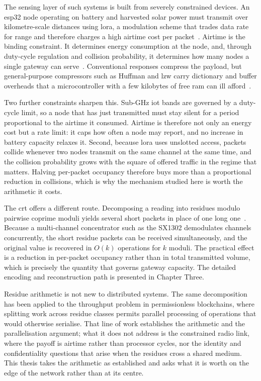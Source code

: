\documentclass[12pt,a4paper,oneside]{book}
\begin{document}
The sensing layer of such systems is built from severely constrained devices.
An \gls{esp32} node operating on battery and harvested solar power must
transmit over kilometre-scale distances using \gls{lora}, a modulation scheme
that trades data rate for range and therefore charges a high airtime cost per
packet~\cite{raza2018lorawan, adelantado2017understanding}. Airtime is the
binding constraint. It determines energy consumption at the node, and, through
duty-cycle regulation and collision probability, it determines how many nodes a
single gateway can serve~\cite{mohammed2025loraEnergy}. Conventional responses
compress the payload, but general-purpose compressors such as Huffman and
\gls{lzw} carry dictionary and buffer overheads that a microcontroller with a
few kilobytes of free \gls{ram} can ill
afford~\cite{marcelloni2009energy, chen2025compression}.

Two further constraints sharpen this. Sub-GHz \gls{iot} bands are governed by a
duty-cycle limit, so a node that has just transmitted must stay silent for a
period proportional to the airtime it consumed. Airtime is therefore not only
an energy cost but a rate limit: it caps how often a node may report, and no
increase in battery capacity relaxes it. Second, because \gls{lora} uses
unslotted access, packets collide whenever two nodes transmit on the same
channel at the same time, and the collision probability grows with the square
of offered traffic in the regime that matters. Halving per-packet occupancy
therefore buys more than a proportional reduction in collisions, which is why
the mechanism studied here is worth the arithmetic it costs.

The \gls{crt} offers a different route. Decomposing a reading into residues
modulo pairwise coprime moduli yields several short packets in place of one
long one~\cite{garner1959residue, ding1996remainder}. Because a multi-channel
concentrator such as the SX1302 demodulates channels concurrently, the short
residue packets can be received simultaneously, and the original value is
recovered in $O(k)$ operations for $k$ moduli. The practical effect is a
reduction in per-packet occupancy rather than in total transmitted volume,
which is precisely the quantity that governs gateway capacity. The detailed
encoding and reconstruction path is presented in Chapter Three.

Residue arithmetic is not new to distributed systems. The same decomposition has
been applied to the throughput problem in permissionless blockchains, where
splitting work across residue classes permits parallel processing of operations
that would otherwise serialise. That line of work establishes the arithmetic and
the parallelisation argument; what it does not address is the constrained radio
link, where the payoff is airtime rather than processor cycles, nor the identity
and confidentiality questions that arise when the residues cross a shared
medium. This thesis takes the arithmetic as established and asks what it is
worth on the edge of the network rather than at its centre.
\end{document}
